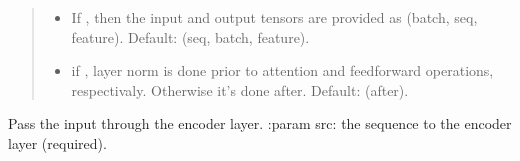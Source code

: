 \documentclass[letterpaper,10pt,english]{sphinxmanual}
\begin{document}
\begin{fulllineitems}
\begin{quote}
\begin{description}
\begin{itemize}
\item {} 
\sphinxAtStartPar
{} \textendash{} If , then the input and output tensors are provided
as (batch, seq, feature). Default:  (seq, batch, feature).

\item {} 
\sphinxAtStartPar
{} \textendash{} if , layer norm is done prior to attention and feedforward
operations, respectivaly. Otherwise it’s done after. Default:  (after).

\end{itemize}

\end{description}\end{quote}

\begin{fulllineitems}
\label{\detokenize{beyondml.pt.layers:beyondml.pt.layers.MaskedTransformerEncoderLayer.MaskedTransformerEncoderLayer.forward}}
\pysigstartsignatures
{}
\pysigstopsignatures
\sphinxAtStartPar
Pass the input through the encoder layer.
:param src: the sequence to the encoder layer (required).

\end{fulllineitems}


\begin{fulllineitems}
\label{\detokenize{beyondml.pt.layers:beyondml.pt.layers.MaskedTransformerEncoderLayer.MaskedTransformerEncoderLayer.prune}}
\pysigstartsignatures
{}
\pysigstopsignatures
\end{fulllineitems}


\end{fulllineitems}
\end{document}
